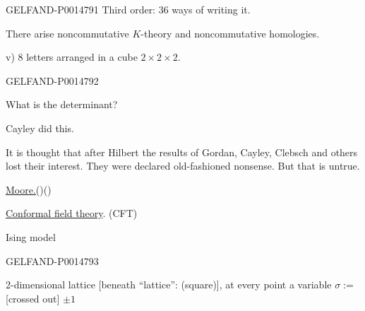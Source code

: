 \begin{GelfandAdjacentEvidence}{GELFAND-P001479}{1}
Third order: 36 ways of writing it.

There arise noncommutative \(K\)-theory and noncommutative homologies.

v) 8 letters arranged in a cube \(2\times2\times2\).
\end{GelfandAdjacentEvidence}
\begin{GelfandAdjacentEvidence}{GELFAND-P001479}{2}


What is the determinant?

Cayley did this.

It is thought that after Hilbert the results of Gordan, Cayley, Clebsch and others lost their interest. They were declared old-fashioned nonsense. But that is untrue.

\underline{\underline{Moore.}}\quad ()\quad ()

\underline{Conformal field theory}. \quad (CFT)

Ising model

\end{GelfandAdjacentEvidence}
\begin{GelfandAdjacentEvidence}{GELFAND-P001479}{3}


2-dimensional lattice [beneath “lattice”: (square)], at every point a variable \(\sigma:=\) [crossed out] \(\pm1\)
\end{GelfandAdjacentEvidence}
